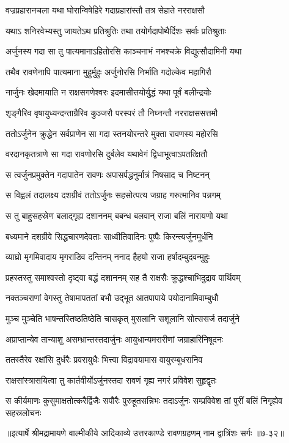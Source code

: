 \twolineshloka
{वज्रप्रहारानचला यथा घोरान्विषेहिरे}
{गदाप्रहारांस्तौ तत्र सेहाते नरराक्षसौ} %

\twolineshloka
{यथाऽ शनिरवेभ्यस्तु जायतेऽथ प्रतिश्रुतिः}
{तथा तयोर्गदापोथैर्दिशः सर्वाः प्रतिश्रुताः} %

\twolineshloka
{अर्जुनस्य गदा सा तु पात्यमानाऽहितोरसि}
{काञ्चनाभं नभश्चक्रे विद्युत्सौदामिनी यथा} %

\twolineshloka
{तथैव रावणेनापि पात्यमाना मुहुर्मुहुः}
{अर्जुनोरसि निर्भाति गदोल्केव महागिरौ} %

\twolineshloka
{नार्जुनः खेदमायाति न राक्षसगणेश्वरः}
{इदमासीत्तयोर्युद्धं यथा पूर्वं बलीन्द्रयोः} %

\twolineshloka
{शृङ्गैरिव वृषायुध्यन्दन्ताग्रैरिव कुञ्जरौ}
{परस्परं तौ निघ्नन्तौ नरराक्षससत्तमौ} %

\twolineshloka
{ततोऽर्जुनेन क्रुद्धेन सर्वप्राणेन सा गदा}
{स्तनयोरन्तरे मुक्ता रावणस्य महोरसि} %

\twolineshloka
{वरदानकृतत्राणे सा गदा रावणोरसि}
{दुर्बलेव यथावेगं द्विधाभूत्वाऽपतत्क्षितौ} %

\twolineshloka
{स त्वर्जुनप्रमुक्तेन गदापातेन रावणः}
{अपासर्पद्धनुर्मात्रं निषसाद च निष्टनन्} %

\twolineshloka
{स विह्वलं तदालक्ष्य दशग्रीवं ततोऽर्जुनः}
{सहसोत्पत्य जग्राह गरुत्मानिव पन्नगम्} %

\twolineshloka
{स तु बाहुसहस्रेण बलाद्गृह्य दशाननम्}
{बबन्ध बलवान् राजा बलिं नारायणो यथा} %

\twolineshloka
{बध्यमाने दशग्रीवे सिद्धचारणदेवताः}
{साध्वीतिवादिनः पुष्पैः किरन्त्यर्जुनमूर्धनि} %

\twolineshloka
{व्याघ्रो मृगमिवादाय मृगराडिव दन्तिनम्}
{ननाद हैहयो राजा हर्षादम्बुदवन्मुहुः} %

\twolineshloka
{प्रहस्तस्तु समाश्वस्तो दृष्ट्वा बद्धं दशाननम्}
{सह तै राक्षसैः क्रुद्धश्चाभिदुद्राव पार्थिवम्} %

\twolineshloka
{नक्तञ्चराणां वेगस्तु तेषामापततां बभौ}
{उद्भूत आतपापाये पयोदानामिवाम्बुधौ} %

\twolineshloka
{मुञ्च मुञ्चेति भाषन्तस्तिष्ठतिष्ठेति चासकृत्}
{मुसलानि सशूलानि सोत्ससर्ज तदार्जुने} %

\twolineshloka
{अप्राप्तान्येव तान्याशु असम्भ्रान्तस्तदार्जुनः}
{आयुधान्यमरारीणां जग्राहारिनिषूदनः} %

\twolineshloka
{ततस्तैरेव रक्षांसि दुर्धरैः प्रवरायुधैः}
{भित्त्वा विद्रावयामास वायुरम्बुधरानिव} %

\twolineshloka
{राक्षसांस्त्रासयित्वा तु कार्तवीर्योऽर्जुनस्तदा}
{रावणं गृह्य नगरं प्रविवेश सुहृद्वृतः} %

\twolineshloka
{स कीर्यमाणः कुसुमाक्षतोत्करैर्द्विजैः सपौरैः पुरुहूतसन्निभः}
{तदाऽर्जुनः सम्प्रविवेश तां पुरीं बलिं निगृह्येव सहस्रलोचनः} %


॥इत्यार्षे श्रीमद्रामायणे वाल्मीकीये आदिकाव्ये उत्तरकाण्डे रावणग्रहणम् नाम द्वात्रिंशः सर्गः ॥७-३२॥
